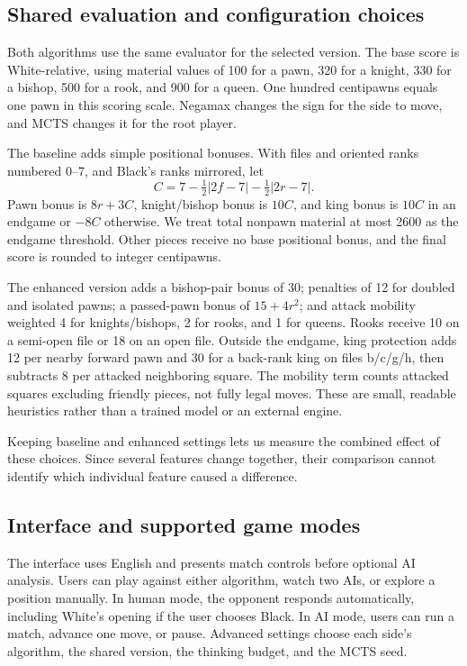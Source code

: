 \documentclass[oneside,final]{hcmut-report}
\begin{document}
\subsection{Shared evaluation and configuration choices}
Both algorithms use the same evaluator for the selected version. The base
score is White-relative, using material values of 100 for a pawn, 320 for a
knight, 330 for a bishop, 500 for a rook, and 900 for a queen. One hundred
centipawns equals one pawn in this scoring scale. Negamax changes the sign
for the side to move, and MCTS changes it for the root player.

The baseline adds simple positional bonuses. With files and oriented ranks
numbered 0--7, and Black's ranks mirrored, let
\[
 C=7-\tfrac12|2f-7|-\tfrac12|2r-7|.
\]
Pawn bonus is $8r+3C$, knight/bishop bonus is $10C$, and king bonus is
$10C$ in an endgame or $-8C$ otherwise. We treat total nonpawn material at
most 2600 as the endgame threshold. Other pieces receive no base positional
bonus, and the final score is rounded to integer centipawns.

The enhanced version adds a bishop-pair bonus of 30; penalties of 12 for
doubled and isolated pawns; a passed-pawn bonus of $15+4r^2$; and attack
mobility weighted 4 for knights/bishops, 2 for rooks, and 1 for queens.
Rooks receive 10 on a semi-open file or 18 on an open file. Outside the
endgame, king protection adds 12 per nearby forward pawn and 30 for a
back-rank king on files b/c/g/h, then subtracts 8 per attacked neighboring
square. The mobility term counts attacked squares excluding friendly pieces,
not fully legal moves. These are small, readable heuristics rather than a
trained model or an external engine.

Keeping baseline and enhanced settings lets us measure the combined effect
of these choices. Since several features change together, their comparison
cannot identify which individual feature caused a difference.

\subsection{Interface and supported game modes}
The interface uses English and presents match controls before optional AI
analysis. Users can play against either algorithm, watch two AIs, or explore
a position manually. In human mode, the opponent responds automatically,
including White's opening if the user chooses Black. In AI mode, users can
run a match, advance one move, or pause. Advanced settings choose each side's
algorithm, the shared version, the thinking budget, and the MCTS seed.
\end{document}
